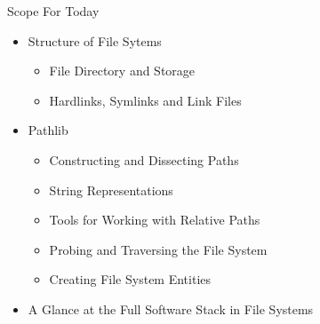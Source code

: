 
\begin{frame}[t,plain]
\titlepage
\end{frame}


\begin{frame}{Scope For Today}
%
\begin{itemize}
\item Structure of File Sytems
	\begin{itemize}
	\item File Directory and Storage
	\item Hardlinks, Symlinks and Link Files
	\end{itemize}
\item Pathlib
	\begin{itemize}
	\item Constructing and Dissecting Paths
	\item String Representations
	\item Tools for Working with Relative Paths
	\item Probing and Traversing the File System
	\item Creating File System Entities
	\end{itemize}
\item A Glance at the Full Software Stack in File Systems
\end{itemize}
%
\end{frame}


